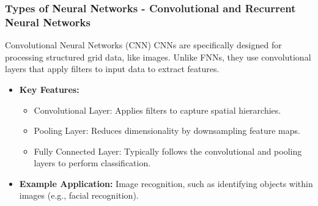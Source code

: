 \documentclass{beamer}
\begin{document}
\begin{frame}
    \frametitle{Types of Neural Networks - Convolutional and Recurrent Neural Networks}
    \begin{block}{Convolutional Neural Networks (CNN)}
        CNNs are specifically designed for processing structured grid data, like images. 
        Unlike FNNs, they use convolutional layers that apply filters to input data to extract features.
    \end{block}

    \begin{itemize}
        \item \textbf{Key Features:}
        \begin{itemize}
            \item Convolutional Layer: Applies filters to capture spatial hierarchies.
            \item Pooling Layer: Reduces dimensionality by downsampling feature maps.
            \item Fully Connected Layer: Typically follows the convolutional and pooling layers to perform classification.
        \end{itemize}
        \item \textbf{Example Application:} Image recognition, such as identifying objects within images (e.g., facial recognition).
    \end{itemize}
\end{frame}
\end{document}
